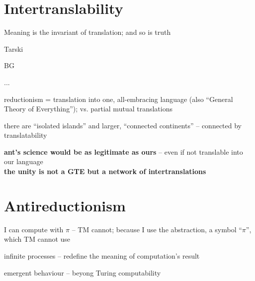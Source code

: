\documentclass[10pt]{article}
\begin{document}
\section{Intertranslability}
\begin{enu}
\item Meaning is the invariant of translation; and so is truth
\begin{enu}
\item Tarski
\item BG
\item ...
\end{enu}
\item reductionism = translation into one, all-embracing language (also
``General Theory of Everything''); vs. partial mutual translations
\item there are ``isolated islands'' and larger, ``connected continents'' --
connected by translatability 
\item {\bf ant's science would be as legitimate as ours} -- even if not translable
into our language\\
{\bf the unity is not a GTE but a network of intertranslations}
\end{enu}

\section{Antireductionism}
\begin{enu}
\item I can compute with $\pi$ -- TM cannot; because I use the abstraction, a
symbol ``$\pi$'', which TM cannot use
\item infinite processes -- redefine the meaning of computation's result
\item emergent behaviour -- beyong Turing computability
\end{enu}
\end{document}
